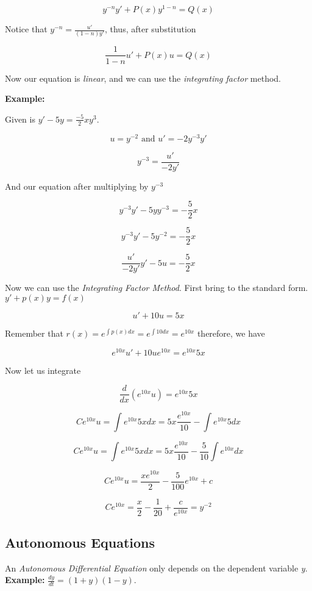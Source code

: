 \[
    y^{-n}y' + P(x)y^{1 - n} = Q(x)
\]


Notice that \(y^{-n} = \frac{u'}{(1-n)y'}\), thus, after substitution

\[
    \frac{1}{1 - n}u' + P(x)u = Q(x)
\]

Now our equation is \emph{linear}, and we can use the \emph{integrating factor} method.
\vspace{\baselineskip}

\textbf{Example: }
\vspace{\baselineskip}

Given is \(y' -5y = \frac{-5}{2}xy^3\).

\[
    u = y^{-2}  \text{ and } u' = -2y^{-3}y'
\]

\[
    y^{-3} = \frac{u'}{-2y'}
\]

And our equation after multiplying by \(y^{-3}\)

\[
    y^{-3}y' - 5yy^{-3} = -\frac{5}{2}x 
\]

\[
    y^{-3}y' - 5y^{-2} = -\frac{5}{2}x 
\]

\[
    \frac{u'}{-2y'}y' - 5u = -\frac{5}{2}x 
\]

Now we can use the \emph{Integrating Factor Method}. First bring to the standard form.
\(y' + p(x)y = f(x)\)

\[
  u' + 10u = 5x 
\]

Remember that \(r(x) = e^{\int p(x)dx} = e^{\int 10 dx} = e^{10x}\) therefore, we have

\[
    e^{10x}u' + 10ue^{10x} = e^{10x}5x
\]

Now let us integrate

\[
    \frac{d}{dx} \left(e^{10x}u\right) = e^{10x}5x
\]

\[
    Ce^{10x}u = \int e^{10x} 5x dx = 5x \frac{e^{10x}}{10} - \int e^{10x}5dx
\]

\[
    Ce^{10x}u = \int e^{10x} 5x dx = 5x \frac{e^{10x}}{10} - \frac{5}{10}\int e^{10x}dx
\]

\[
    Ce^{10x}u = \frac{xe^{10x}}{2} - \frac{5}{100} e^{10x} + c
\]

\[
    Ce^{10x} = \frac{x}{2} - \frac{1}{20} + \frac{c}{e^{10x}} = y^{-2}
\]

\subsection{Autonomous Equations}

An \emph{Autonomous Differential Equation} only depends on the dependent
variable \emph{y}.\textbf{ Example: } \(\frac{dy}{dt} = (1 + y)(1 -y)\).

